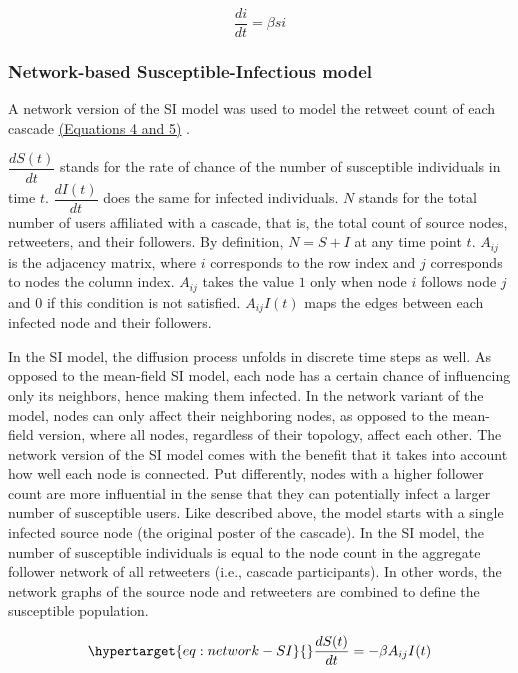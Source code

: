 \documentclass[11pt,a4paper]{article}
\begin{document}
        \begin{equation}
            \frac{di}{dt} = \beta s i
        \end{equation}

        \subsubsection{Network-based Susceptible-Infectious model}
        A network version of the SI model was used to model the retweet count of each cascade \hyperlink{eq:network-SI}{(Equations 4 and 5)} \cite{kermack_contribution_1927}. 

        $\dfrac{dS(t)}{dt}$ stands for the rate of chance of the number of susceptible individuals in time $t$. $\dfrac{dI(t)}{dt}$ does the same for infected individuals. $N$ stands for the total number of users affiliated with a cascade, that is, the total count of source nodes, retweeters, and their followers. By definition, $N = S + I$ at any time point $t$. $A_{ij}$ is the adjacency matrix, where $i$ corresponds to the row index and $j$ corresponds to nodes the column index. $A_{ij}$ takes the value $1$ only when node $i$ follows node $j$ and $0$ if this condition is not satisfied. $A_{ij} I(t)$ maps the edges between each infected node and their followers.
        
        In the SI model, the diffusion process unfolds in discrete time steps as well. As opposed to the mean-field SI model, each node has a certain chance of influencing only its neighbors, hence making them infected. In the network variant of the model, nodes can only affect their neighboring nodes, as opposed to the mean-field version, where all nodes, regardless of their topology, affect each other. The network version of the SI model comes with the benefit that it takes into account how well each node is connected. Put differently, nodes with a higher follower count are more influential in the sense that they can potentially infect a larger number of susceptible users. Like described above, the model starts with a single infected source node (the original poster of the cascade). In the SI model, the number of susceptible individuals is equal to the node count in the aggregate follower network of all retweeters (i.e., cascade participants). In other words, the network graphs of the source node and retweeters are combined to define the susceptible population.
        
        \begin{equation}
            \hypertarget{eq:network-SI}{}
            \frac{dS(t)}{dt} = - \beta A_{ij} I(t) 
        \end{equation}
\end{document}
